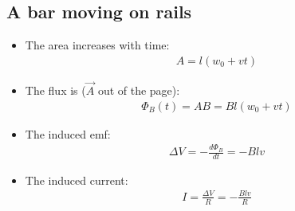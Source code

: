 \documentclass[aspectratio=169,
hyperref={colorlinks,urlcolor=blue}
]{beamer}
\begin{document}
\subsection{A bar moving on rails}
{\scriptsize
\begin{itemize}
\item<1-> The area increases with time:%
\begin{align*}%
A=l(w_0+vt)%
\end{align*}%
\item<2-> The flux is ($\vec A$ out of the page):%
\begin{align*}%
\Phi_B(t)=AB=Bl(w_0+vt)%
\end{align*}%
\item<3-> The induced emf:%
\begin{align*}%
\Delta V=-\frac{d\Phi_B}{dt}=-Blv%
\end{align*}%
\item<4-> The induced current:%
\begin{align*}%
I=\frac{\Delta V}{R}=-\frac{Blv}{R}%
\end{align*}%
\end{itemize}
}
\end{document}
